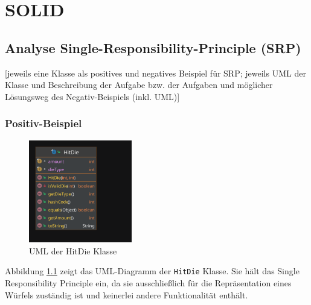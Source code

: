 \chapter{SOLID}

\section{Analyse Single-Responsibility-Principle (SRP)}
[jeweils eine Klasse als positives und negatives Beispiel für SRP;  jeweils UML der Klasse und Beschreibung der Aufgabe bzw. der Aufgaben und möglicher Lösungsweg des Negativ-Beispiels (inkl. UML)]
\subsection{Positiv-Beispiel}
\begin{figure}[H]
	\centering
	\includegraphics[width=0.4\textwidth]{Bilder/HitDie.pdf}
	\caption{UML der HitDie Klasse}
	\label{fig:HitDie-Solid}
\end{figure}
Abbildung \ref{fig:HitDie-Solid} zeigt das UML-Diagramm der \texttt{HitDie} Klasse. Sie hält das Single Responsibility Principle ein, da sie ausschließlich für die Repräsentation eines Würfels zuständig ist und keinerlei andere Funktionalität enthält.

